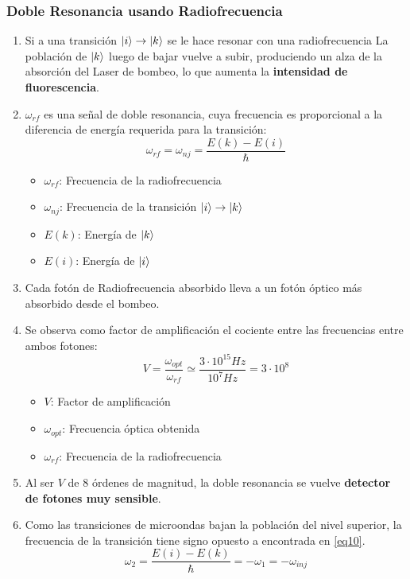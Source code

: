 \documentclass[aps,rmp,reprint,longbibliography]{revtex4-1}
\begin{document}
\subsubsection{Doble Resonancia usando Radiofrecuencia}
\begin{enumerate}
\item Si a una transición $\ket{i}\rightarrow \ket{k}$ se le hace  resonar con una radiofrecuencia La población de $\ket{k}$ luego de bajar vuelve a subir, produciendo un alza de la absorción del Laser de bombeo, lo que aumenta la \textbf{intensidad de fluorescencia}.
\item $\omega_{rf}$ es una señal de doble resonancia, cuya frecuencia es proporcional a la diferencia de energía requerida para la transición:
\begin{equation}\label{eq12}\omega_{rf}=\omega_{nj}=\frac{E(k)-E(i)}{\hslash}\end{equation}
\begin{itemize}
    \item $\omega_{rf}$: Frecuencia de la radiofrecuencia
    \item $\omega_{nj}$: Frecuencia de la transición $\ket{i}\rightarrow\ket{k}$
    \item $E(k)$: Energía de $\ket{k}$
    \item $E(i)$: Energía de $\ket{i}$
\end{itemize}
\item Cada fotón de Radiofrecuencia absorbido lleva a un fotón óptico más absorbido desde el bombeo.
\item Se observa como factor de amplificación el cociente entre las frecuencias entre ambos fotones:
\begin{equation}\label{eq13}V=\frac{\omega_{opt}}{\omega_{rf}}\simeq\frac{3\cdot 10^{15} Hz}{10^7 Hz}=3\cdot 10^8\end{equation}
\begin{itemize}
    \item $V$: Factor de amplificación
    \item $\omega_{opt}$: Frecuencia óptica obtenida
    \item $\omega_{rf}$: Frecuencia de la radiofrecuencia
\end{itemize}
\item Al ser $V$ de 8 órdenes de magnitud, la doble resonancia se vuelve \textbf{detector de fotones muy sensible}.
\item Como las transiciones de microondas bajan la población del nivel superior, la frecuencia de la transición tiene signo opuesto a encontrada en \ref{eq10}. \begin{equation}\label{eq14}\omega_2=\frac{E(i)-E(k)}{\hslash}=-\omega_1=-\omega_{inj}\end{equation}

\end{enumerate}
\end{document}
